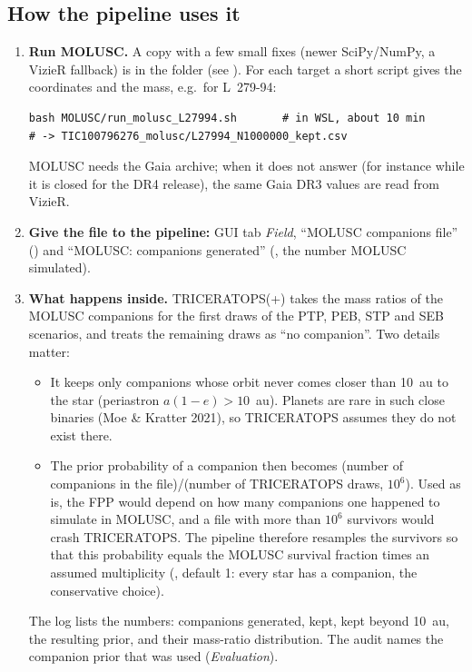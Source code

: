 \subsection*{How the pipeline uses it}
\begin{enumerate}
\item \textbf{Run MOLUSC.} A copy with a few small fixes (newer SciPy/NumPy, a VizieR fallback) is
in the folder  (see ). For each target a
short script gives the coordinates and the mass, e.g.\ for L~279-94:
\begin{lstlisting}
bash MOLUSC/run_molusc_L27994.sh       # in WSL, about 10 min
# -> TIC100796276_molusc/L27994_N1000000_kept.csv
\end{lstlisting}
MOLUSC needs the Gaia archive; when it does not answer (for instance while
it is closed for the DR4 release), the same Gaia DR3 values are read from
VizieR.
\item \textbf{Give the file to the pipeline:} GUI tab \emph{Field},
``MOLUSC companions file'' () and ``MOLUSC: companions
generated'' (, the number MOLUSC simulated).
\item \textbf{What happens inside.} TRICERATOPS(+) takes the mass ratios of
the MOLUSC companions for the first draws of the PTP, PEB, STP and SEB
scenarios, and treats the remaining draws as ``no companion''. Two details
matter:
\begin{itemize}
\item It keeps only companions whose orbit never comes closer than 10~au to
the star (periastron $a(1-e) > 10$~au). Planets are rare in such close
binaries (Moe \& Kratter 2021), so TRICERATOPS assumes they do not exist
there.
\item The prior probability of a companion then becomes (number of
companions in the file)/(number of TRICERATOPS draws, $10^6$). Used as is,
the FPP would depend on how many companions one happened to simulate in
MOLUSC, and a file with more than $10^6$ survivors would crash
TRICERATOPS. The pipeline therefore resamples the survivors so that this
probability equals the MOLUSC survival fraction times an assumed
multiplicity (, default 1: every star has a
companion, the conservative choice).
\end{itemize}
The log lists the numbers: companions generated, kept, kept beyond 10~au,
the resulting prior, and their mass-ratio distribution. The audit names
the companion prior that was used (\emph{Evaluation}).
\end{enumerate}

